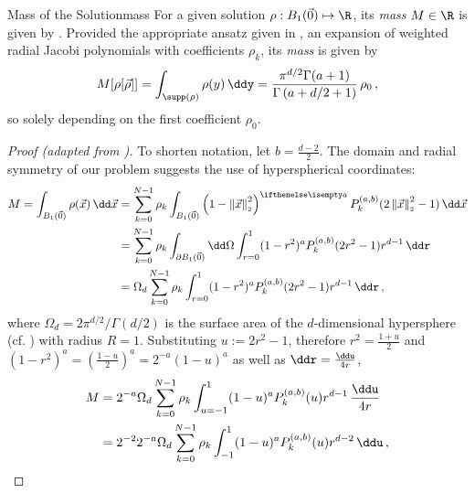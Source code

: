 \begin{lemma}{Mass of the Solution}{mass}
  For a given solution $\rho: B_1(\vec{0}) \mapsto \R$, its \textit{mass} $M \in \R$ is given by .
  Provided the appropriate ansatz given in , an expansion of weighted radial Jacobi polynomials with coefficients $\rho_k$, its \textit{mass} is given by
  \begin{align*}
    M[\rho[\vec{\rho}]] = \int_{\supp(\rho)} \rho(y) \,\ddy = \frac{\pi^{{d/2}}\Gamma (a+1)}{\Gamma \left(a+{d/2}+1\right)}\, \rho_0\,,
  \end{align*}
  so solely depending on the first coefficient $\rho_0$.
\end{lemma}
\begin{proof}[Proof (adapted from \cite{2021-arbitrary-dimensions})]
  To shorten notation, let $b = \frac{d-2}{2}$.
  The domain and radial symmetry of our problem suggests the use of hyperspherical coordinates:
  \begin{align*}
    M = \int_{B_1(\vec{0})} \rho(\vec{x}) \,\dd\vec{x} & = \sum_{k=0}^{N-1} \rho_k \int_{B_1(\vec{0})} \weight{x} P_k^{(a,b)}(\jacobiarg{x}) \,\dd\vec{x}                          \\
                                                       & =\sum_{k=0}^{N-1} \rho_k \int_{\partial B_1(\vec{0})} \dd\Omega \int_{r=0}^1 (1-r^2)^a P_k^{(a,b)}(2r^2-1) r^{d-1} \,\ddr \\
                                                       & = \Omega_d \sum_{k=0}^{N-1} \rho_k \int_{r=0}^1 (1-r^2)^a P_k^{(a,b)}(2r^2-1) r^{d-1} \,\ddr\,,
  \end{align*}
  where $\Omega_d = {2\pi^{d/2}} / {\Gamma({d/2})}$ is the surface area of the $d$-dimensional hypersphere (cf. ) with radius $R = 1$.
  Substituting $u := 2r^2-1$, therefore $r^2 = \frac{1+u}{2}$ and $(1-r^2)^a = \left(\frac{1-u}{2}\right)^a = 2^{-a} (1-u)^a$ as well as $\ddr = \frac{\ddu}{4r}$,
  \begin{align*}
    M & = 2^{-a} \Omega_d \sum_{k=0}^{N-1} \rho_k \int_{u=-1}^1 (1-u)^a P_k^{(a,b)}(u) r^{d-1} \,\frac{\ddu}{4r} \\
      & = 2^{-2} 2^{-a} \Omega_d \sum_{k=0}^{N-1} \rho_k \int_{-1}^1 (1-u)^a P_k^{(a,b)}(u) r^{d-2}\,\ddu\,,

\end{align*}
\end{proof}
